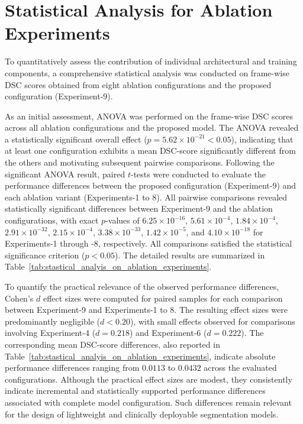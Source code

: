 \documentclass[12pt,letterpaper]{article}
\begin{document}
 









 




\section{Statistical Analysis for Ablation Experiments}

To quantitatively assess the contribution of individual architectural and training components, a comprehensive statistical analysis was conducted on frame-wise DSC scores obtained from eight ablation configurations and the proposed configuration (Experiment-9).

As an initial assessment, ANOVA was performed on the frame-wise DSC scores across all ablation configurations and the proposed model. The ANOVA revealed a statistically significant overall effect ($p = 5.62 \times 10^{-21} < 0.05$), indicating that at least one configuration exhibits a mean DSC-score significantly different from the others and motivating
subsequent pairwise comparisons. %
Following the significant ANOVA result, paired $t$-tests were conducted to evaluate the performance differences between the proposed configuration (Experiment-9) and each ablation variant (Experiments-1 to 8). All pairwise comparisons revealed statistically significant differences between Experiment-9 and the ablation configurations, with exact $p$-values of
$6.25 \times 10^{-16}$, $5.61 \times 10^{-4}$, $1.84 \times 10^{-4}$,
$2.91 \times 10^{-32}$, $2.15 \times 10^{-4}$, $3.38 \times 10^{-33}$,
$1.42 \times 10^{-5}$, and $4.10 \times 10^{-18}$ for Experiments-1 through -8,
respectively. All comparisons satisfied the statistical significance criterion
($p < 0.05$). The detailed results are summarized in
Table~\ref{tab:stastical_analyis_on_ablation_experiments}.


To quantify the practical relevance of the observed performance differences,
Cohen’s $d$ effect sizes were computed for paired samples for each comparison
between Experiment-9 and Experiments-1 to 8. The resulting effect sizes
were predominantly negligible ($d < 0.20$), with small effects observed for
comparisons involving Experiment-4 ($d = 0.218$) and Experiment-6
($d = 0.222$). The corresponding mean DSC-score differences, also reported in
Table~\ref{tab:stastical_analyis_on_ablation_experiments}, indicate absolute performance
differences ranging from $0.0113$ to $0.0432$ across the evaluated configurations. Although the practical effect sizes are modest, they consistently indicate
incremental and statistically supported performance differences associated
with complete model configuration. Such differences remain relevant for the
design of lightweight and clinically deployable segmentation models.
\end{document}

